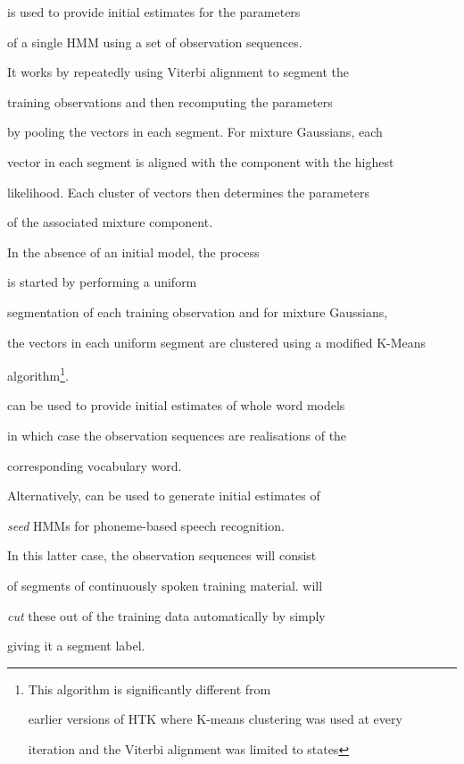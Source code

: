  is used to provide initial estimates for the parameters


of a single HMM using a set of observation sequences.


It works by repeatedly using Viterbi alignment to segment the


training observations and then recomputing the parameters


by pooling the vectors in each segment.   For mixture Gaussians, each


vector in each segment is aligned with the component with the highest


likelihood.   Each cluster of vectors then determines the parameters


of the associated mixture component.


In the absence of an initial model, the process


is started by performing a uniform 


segmentation of each training observation and for mixture Gaussians,


the vectors in each uniform segment are clustered using a modified K-Means 


algorithm\footnote{This algorithm is significantly different from 


earlier versions of HTK where K-means clustering was used at every


iteration and the Viterbi alignment was limited to states}. 





 can be used to provide initial estimates of whole word models


in which case the observation sequences are realisations of the 


corresponding vocabulary word.


Alternatively,  can be used to generate initial estimates of


{\em seed} HMMs for phoneme-based speech recognition.


In this latter case, the observation sequences will consist


of segments of continuously spoken training material.   will


{\it cut} these out of the training data automatically by simply


giving it a segment label.





